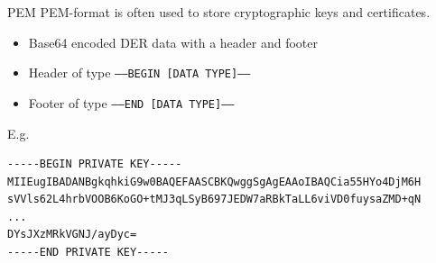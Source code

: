 \begin{frame}[fragile]{PEM}
  PEM-format is often used to store cryptographic keys and certificates.
  \pause
  \begin{itemize}
    \item Base64 encoded DER data with a header and footer
    \item Header of type \texttt{-----BEGIN [DATA TYPE]-----}
    \item Footer of type \texttt{-----END [DATA TYPE]-----}
  \end{itemize}

  \pause
  E.g.
  \begin{Verbatim}[fontsize=\scriptsize]
-----BEGIN PRIVATE KEY-----
MIIEugIBADANBgkqhkiG9w0BAQEFAASCBKQwggSgAgEAAoIBAQCia55HYo4DjM6H
sVVls62L4hrbVOOB6KoGO+tMJ3qLSyB697JEDW7aRBkTaLL6viVD0fuysaZMD+qN
...
DYsJXzMRkVGNJ/ayDyc=
-----END PRIVATE KEY-----
  \end{Verbatim}
\end{frame}



